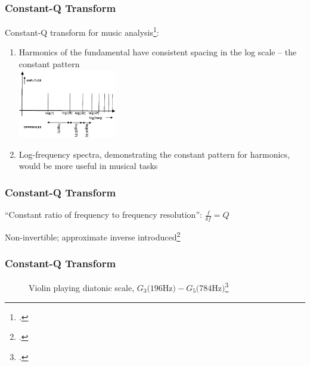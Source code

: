 \documentclass[usenames,dvipsnames]{beamer}
\begin{document}
\begin{frame}
	\frametitle{Constant-Q Transform}
	Constant-Q transform for music analysis\footcite{jbrown, msp}:
		\begin{enumerate}
			\item
				Harmonics of the fundamental have consistent spacing in the log scale -- the constant pattern\\
				\includegraphics[height=3cm]{./images-mila-presentation/logharmonic.png}
			\item
				Log-frequency spectra, demonstrating the constant pattern for harmonics, would be more useful in musical tasks
		\end{enumerate}
\end{frame}

\begin{frame}
	\frametitle{Constant-Q Transform}
	``Constant ratio of frequency to frequency resolution'': $\frac{f}{\delta f} = Q$
	\begin{figure}
		\setcounter{subfigure}{0}
		\vspace{-1em}
		\centering
	\end{figure}
	Non-invertible; approximate inverse introduced\footcite{klapuricqt}
\end{frame}

\begin{frame}
	\frametitle{Constant-Q Transform}
	\begin{figure}
		\setcounter{subfigure}{0}
		\centering
		\caption{Violin playing diatonic scale, $G_{3} \text{(196Hz)} - G_{5} \text{(784Hz)}$\footcite{jbrown}}
	\end{figure}
\end{frame}
\end{document}
